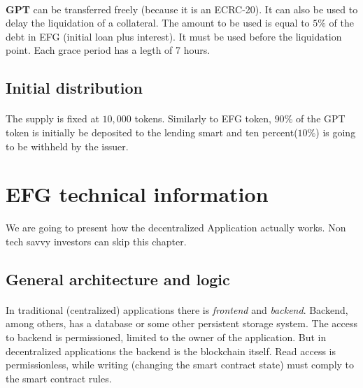\documentclass{article}
\begin{document}
\paragraph{ }
\textbf{GPT} can be transferred freely (because it is an ECRC-20). It can also be used to delay the liquidation of a collateral. The amount to be used is equal to $5\%$ of the debt in EFG (initial loan plus interest). It must be used before the liquidation point. Each grace period has a legth of 7 hours.
\subsection{Initial distribution}
\paragraph{ }
The supply is fixed at $10,000$ tokens. Similarly to EFG token, $90\%$ of the GPT token is initially be deposited to the lending smart and ten percent($10\%$) is going to be withheld by the issuer.

\section{EFG technical information}
We are going to present how the decentralized Application actually works. Non tech savvy investors can skip this chapter.
\subsection{General architecture and logic}
\paragraph{ }
In traditional (centralized) applications there is \emph{frontend} and \emph{backend}. Backend, among others, has a database or some other persistent storage system. The access to backend is permissioned, limited to the owner of the application. But in decentralized applications the backend is the blockchain itself. Read access is permissionless, while writing (changing the smart contract state) must comply to the smart contract rules.
\end{document}
